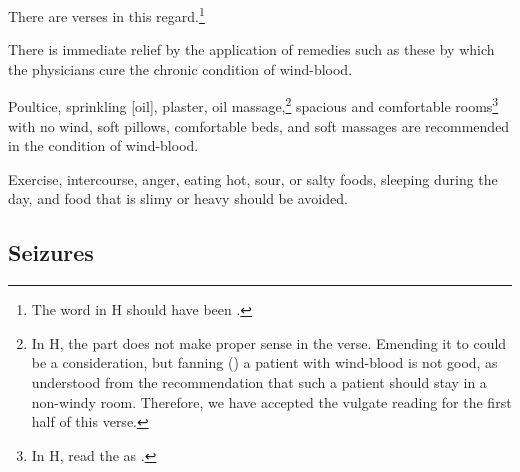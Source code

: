 \begin{translation}
\begin{tt}
\item[14]

There are verses in this regard.\footnote{The word  in H
    should have been .}

\begin{sloka}
There is immediate relief by the application of remedies such as these by
which the physicians cure the chronic condition of wind-blood.
\end{sloka}


\item[15--16]

\begin{sloka}
Poultice, sprinkling [oil], plaster, oil massage,\footnote{In H, the
    part  does not make proper sense in the verse.
    Emending it to  could be a consideration, but
    fanning () a patient with wind-blood is not good, as
    understood from the recommendation that such a patient should stay in
    a non-windy room. Therefore, we have accepted the vulgate reading for
    the first half of this verse.} spacious and comfortable
    rooms\footnote{In H, read the   as .}
        with no wind, soft pillows, comfortable beds, and soft massages are
        recommended in the condition of wind-blood.
\end{sloka}

\item[17]

\begin{sloka}
Exercise, intercourse, anger, eating hot, sour, or salty foods,
sleeping during the day, and food that is slimy or heavy should be
avoided.
\end{sloka}

\subsection{Seizures}

\item[18]


\end{tt}
\end{translation}
